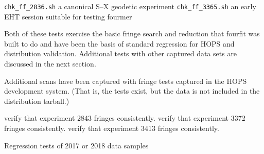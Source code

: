 \begin{description}
 \texttt{chk\_ff\_2836.sh} a canonical S--X geodetic experiment
 \texttt{chk\_ff\_3365.sh} an early \ac{EHT} session suitable for
    testing \ac{fourmer}
\end{description}
Both of these tests exercise the basic fringe search and reduction
that \acs{fourfit} was built to do and have been the basis of standard
regression for \ac{HOPS} and distribution validation.   Additional tests
with other captured data sets are discussed in the next section.







Additional scans have been captured with fringe tests captured
in the \ac{HOPS} development system.  (That is, the tests exist,
but the data is not included in the distribution tarball.)

\begin{description}
 verify that experiment 2843 fringes consistently.
 verify that experiment 3372 fringes consistently.
 verify that experiment 3413 fringes consistently.

 Regression tests of 2017 or 2018 data samples

\end{description}

